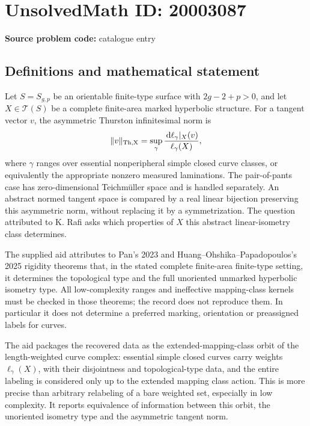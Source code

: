 \documentclass[11pt]{article}
\newcommand{\dd}{\,\mathrm{d}}
\begin{document}
\section*{UnsolvedMath ID: 20003087}
\textbf{Source problem code:} catalogue entry
\subsection{Definitions and mathematical statement}
Let \(S=S_{g,p}\) be an orientable finite-type surface with \(2g-2+p>0\), and let \(X\in\mathcal T(S)\) be a complete finite-area marked hyperbolic structure. For a tangent vector \(v\), the asymmetric Thurston infinitesimal norm is
\[
\|v\|_{\rm Th,X}=\sup_{\gamma}\frac{\dd\ell_\gamma|_X(v)}{\ell_\gamma(X)},
\]
where \(\gamma\) ranges over essential nonperipheral simple closed curve classes, or equivalently the appropriate nonzero measured laminations. The pair-of-pants case has zero-dimensional Teichm\"uller space and is handled separately. An abstract normed tangent space is compared by a real linear bijection preserving this asymmetric norm, without replacing it by a symmetrization. The question attributed to K. Rafi asks which properties of \(X\) this abstract linear-isometry class determines.

The supplied aid attributes to Pan's 2023 and Huang--Ohshika--Papadopoulos's 2025 rigidity theorems that, in the stated complete finite-area finite-type setting, it determines the topological type and the full unoriented unmarked hyperbolic isometry type. All low-complexity ranges and ineffective mapping-class kernels must be checked in those theorems; the record does not reproduce them. In particular it does not determine a preferred marking, orientation or preassigned labels for curves.

The aid packages the recovered data as the extended-mapping-class orbit of the length-weighted curve complex: essential simple closed curves carry weights \(\ell_\gamma(X)\), with their disjointness and topological-type data, and the entire labeling is considered only up to the extended mapping class action. This is more precise than arbitrary relabeling of a bare weighted set, especially in low complexity. It reports equivalence of information between this orbit, the unoriented isometry type and the asymmetric tangent norm.
\end{document}
